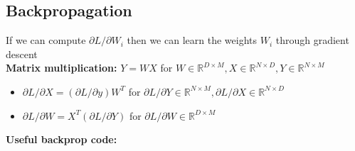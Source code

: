 \documentclass[9pt]{extarticle}
\begin{document}
\subsection{Backpropagation}
If we can compute $\partial L / \partial W_i$ then we can learn the weights $W_i$ through gradient descent\\
\textbf{Matrix multiplication:} $Y = WX$ for $W \in \mathbb{R}^{D\times M}, X \in \mathbb{R}^{N\times D}, Y\in \mathbb{R}^{N\times M}$
\begin{itemize}
    \item $\partial L / \partial X = (\partial L / \partial y) W^T$ for $\partial L / \partial Y \in \mathbb{R}^{N\times M}, \partial L / \partial X \in \mathbb{R}^{N\times D}$
    \item $\partial L / \partial W = X^T(\partial L / \partial Y) $ for $\partial L / \partial W \in \mathbb{R}^{D\times M}$
\end{itemize}
\textbf{Useful backprop code:}
\end{document}
